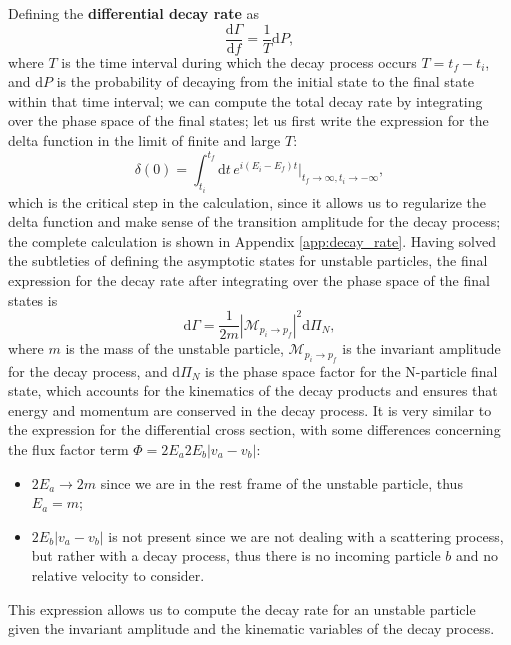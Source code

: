 Defining the \textbf{differential decay rate} as
\begin{equation}
    \frac{\mathrm{d} \Gamma}{\mathrm{d} f} = \frac{1}{T} \mathrm{d} P,
    \label{eq:differential_decay_rate}
\end{equation}
where \(T\) is the time interval during which the decay process occurs \(T = t_f-t_i\), and \(\mathrm{d} P\) is the probability of decaying from the initial state to the final state within that time interval; we can compute the total decay rate by integrating over the phase space of the final states; let us first write the expression for the delta function in the limit of finite and large \(T\):
\[
    \delta(0) = \int_{t_i}^{t_f} \mathrm{d} t \, e^{i (E_i - E_f) t} |_{t_f \to \infty, t_i \to -\infty},
\]
which is the critical step in the calculation, since it allows us to regularize the delta function and make sense of the transition amplitude for the decay process; the complete calculation is shown in Appendix \ref{app:decay_rate}.
Having solved the subtleties of defining the asymptotic states for unstable particles, the final expression for the decay rate after integrating over the phase space of the final states is
\begin{equation}
    \mathrm{d} \Gamma = \frac{1}{2 m} |\mathcal{M}_{p_i \to p_f}|^2 \mathrm{d} \Pi_N,
    \label{eq:decay_rate_final_state_phase_space}
\end{equation}
where \(m\) is the mass of the unstable particle, \(\mathcal{M}_{p_i \to p_f}\) is the invariant amplitude for the decay process, and \(\mathrm{d} \Pi_N\) is the phase space factor for the N-particle final state, which accounts for the kinematics of the decay products and ensures that energy and momentum are conserved in the decay process.
It is very similar to the expression for the differential cross section, with some differences concerning the flux factor term \(\Phi = 2E_a 2E_b \vert v_a - v_b \vert\):
\begin{itemize}
    \item \(2E_a \to 2m\) since we are in the rest frame of the unstable particle, thus \(E_a = m\);
    \item \(2E_b \vert v_a - v_b \vert \) is not present since we are not dealing with a scattering process, but rather with a decay process, thus there is no incoming particle \(b\) and no relative velocity to consider.
\end{itemize}
This expression allows us to compute the decay rate for an unstable particle given the invariant amplitude and the kinematic variables of the decay process.

